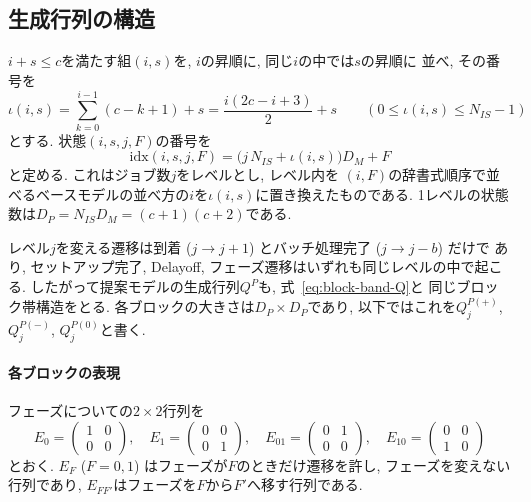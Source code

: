 \documentclass[a4paper, 11pt, dvipdfmx]{jsreport}
\begin{document}
 

\subsection{生成行列の構造}
\label{sec:pred-generator}
 
$i+s \le c$を満たす組$(i, s)$を, $i$の昇順に, 同じ$i$の中では$s$の昇順に
並べ, その番号を
\begin{equation}
    \iota(i, s) = \sum_{k=0}^{i-1} (c - k + 1) + s
               = \frac{i(2c - i + 3)}{2} + s
    \qquad (0 \le \iota(i, s) \le N_{IS} - 1)
    \label{eq:pred-iota}
\end{equation}
とする. 状態$(i, s, j, F)$の番号を
\begin{equation}
    \mathrm{idx}(i, s, j, F) = \bigl( j\, N_{IS} + \iota(i, s) \bigr) D_M + F
    \label{eq:pred-index}
\end{equation}
と定める. これはジョブ数$j$をレベルとし, レベル内を
$(i, F)$の辞書式順序で並べるベースモデルの並べ方の$i$を$\iota(i, s)$に置き換えたものである. 
1レベルの状態数は$D_P = N_{IS} D_M = (c+1)(c+2)$である. 
 
レベル$j$を変える遷移は到着 ($j \to j+1$) とバッチ処理完了 ($j \to j-b$) だけで
あり, セットアップ完了, Delayoff, フェーズ遷移はいずれも同じレベルの中で起こる. 
したがって提案モデルの生成行列$Q^{P}$も, 式~\eqref{eq:block-band-Q}と
同じブロック帯構造をとる. 各ブロックの大きさは$D_P \times D_P$であり, 
以下ではこれを$Q^{P(+)}_j$, $Q^{P(-)}_j$, $Q^{P(0)}_j$と書く. 
 
\paragraph{各ブロックの表現}
フェーズについての$2 \times 2$行列を
\begin{equation}
    E_0 = \begin{pmatrix} 1 & 0 \\ 0 & 0 \end{pmatrix}, \quad
    E_1 = \begin{pmatrix} 0 & 0 \\ 0 & 1 \end{pmatrix}, \quad
    E_{01} = \begin{pmatrix} 0 & 1 \\ 0 & 0 \end{pmatrix}, \quad
    E_{10} = \begin{pmatrix} 0 & 0 \\ 1 & 0 \end{pmatrix}
\end{equation}
とおく. $E_F$ ($F = 0, 1$) はフェーズが$F$のときだけ遷移を許し, フェーズを変えない
行列であり, $E_{FF'}$はフェーズを$F$から$F'$へ移す行列である. 
\end{document}

